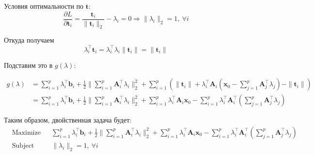 \documentclass{article}
\begin{document}
\begin{enumerate}
	      Условия оптимальности по $\mathbf{t}$:
	      \[
		      \frac{\partial L}{\partial \mathbf{t}_i} =
		      \frac{\mathbf{t}_i}{\| \mathbf{t}_i \|_2} -
		      \lambda_i = 0
		      \Rightarrow \| \lambda_i \|_2 = 1,
		      \ \forall i
	      \]

	      Откуда получаем
	      \[
		      \lambda_i^\top \mathbf{t}_i =
		      \lambda_i^\top \lambda_i \| \mathbf{t}_i \| =
		      \| \mathbf{t}_i \|
	      \]

	      Подставим это в $g(\lambda)$:

	      \begin{align*}
		      g(\lambda) & =
		      \sum_{i=1}^p \lambda_i^\top \mathbf{b}_i +
		      \frac{1}{2} \| \sum_{i=1}^p
		      \mathbf{A}_i^\top \lambda_i \|_2^2 +
		      \sum_{i=1}^p \left(
		      \| \mathbf{t}_i \| +
		      \lambda_i^\top
		      \mathbf{A}_i \left(
			      \mathbf{x}_0 -
			      \sum_{j=1}^p
			      \mathbf{A}_j^\top \lambda_j
			      \right) -
		      \| \mathbf{t}_i \|
		      \right)                                                   \\
		                 & = \sum_{i=1}^p \lambda_i^\top \mathbf{b}_i +
		      \frac{1}{2} \| \sum_{i=1}^p
		      \mathbf{A}_i^\top \lambda_i \|_2^2 +
		      \sum_{i=1}^p \lambda_i^\top
		      \mathbf{A}_i \mathbf{x}_0 -
		      \sum_{i=1}^p \lambda_i^\top
		      \mathbf{A}_i^\top \left(
		      \sum_{j=1}^p \mathbf{A}_j^\top \lambda_j
		      \right)
	      \end{align*}

	      Таким образом, двойственная задача будет:
	      \begin{equation*}
		      \begin{aligned}
			       & \text{Maximize}   &  & \sum_{i=1}^p \lambda_i^\top \mathbf{b}_i + \frac{1}{2} \| \sum_{i=1}^p \mathbf{A}_i^\top \lambda_i \|_2^2 + \sum_{i=1}^p \lambda_i^\top \mathbf{A}_i \mathbf{x}_0 - \sum_{i=1}^p \lambda_i^\top \mathbf{A}_i^\top \left( \sum_{j=1}^p \mathbf{A}_j^\top \lambda_j \right) \\
			       & \text{Subject to} &  & \| \lambda_i \|_2 = 1, \ \forall i
		      \end{aligned}
	      \end{equation*}
\end{enumerate}
\end{document}
